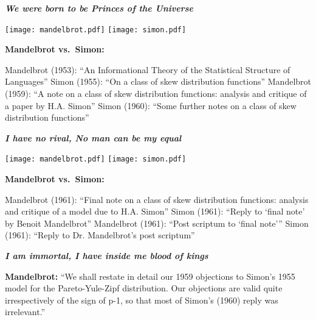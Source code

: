 

  \textbf{\small\textit{We were born to be Princes of the Universe}}

  \smallskip

  \texttt{[image: mandelbrot.pdf]}
  \quad
  \texttt{[image: simon.pdf]}

  \textbf{Mandelbrot vs.\ Simon:}
    
     Mandelbrot (1953): ``An Informational Theory of the Statistical Structure of Languages''\cite{mandelbrot1953a}
     Simon (1955): ``On a class of skew distribution functions''\cite{simon1955a}
     Mandelbrot (1959):  ``A note on a class of skew distribution functions: analysis and critique of a paper by H.A. Simon''\cite{mandelbrot1959a}
     Simon (1960): ``Some further notes on a class of skew distribution functions''\cite{simon1960a}
    
  


  \textbf{\small\textit{I have no rival, No man can be my equal}}

  \smallskip

  \texttt{[image: mandelbrot.pdf]}
  \quad
  \texttt{[image: simon.pdf]}

  \textbf{Mandelbrot vs.\ Simon:}
    
     Mandelbrot (1961): ``Final note on a class of skew distribution functions: analysis and critique of a model due to H.A. Simon''\cite{mandelbrot1961b}
     Simon (1961): ``Reply to `final note' by Benoit Mandelbrot''\cite{simon1961a}
     Mandelbrot (1961): ``Post scriptum to `final note'''\cite{mandelbrot1961b}
     Simon (1961): ``Reply to Dr. Mandelbrot's post scriptum''\cite{simon1961b}
  
  

  \textbf{\small\textit{I am immortal, I have inside me blood of kings}}

  \textbf{Mandelbrot:}
    ``We shall restate in detail our 1959 objections to Simon's 1955
    model for the Pareto-Yule-Zipf distribution.  
    Our objections are
    valid quite irrespectively of the sign of p-1, so that 
    most of
    Simon's (1960) reply was irrelevant.''\cite{mandelbrot1961a}
  

